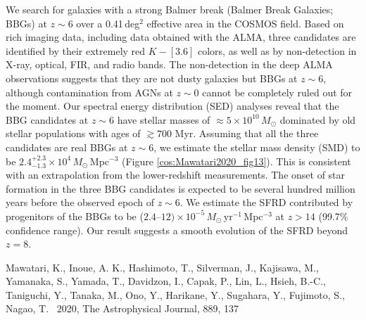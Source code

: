 We search for galaxies with a strong Balmer break (Balmer Break Galaxies; BBGs) 
at $z \sim 6$ over a 0.41\,deg$^2$ effective area in the COSMOS field. 
Based on rich imaging data, including data obtained with the ALMA, 
three candidates are identified by their extremely red $K - [3.6]$ colors, 
as well as by non-detection in X-ray, optical, 
FIR, 
and radio bands. 
The non-detection in the deep ALMA observations suggests that 
they are not dusty galaxies but BBGs at $z \sim 6$, 
although contamination from 
AGNs 
at $z \sim 0$ cannot be completely ruled out for the moment.
Our spectral energy distribution (SED) analyses reveal that 
the BBG candidates at $z \sim 6$ have stellar masses of $\approx 5 \times 10^{10}\,M_{\odot}$ 
dominated by old stellar populations with ages of $\gtrsim 700$ Myr. 
Assuming that all the three candidates are real BBGs at $z \sim 6$, 
we estimate the stellar mass density (SMD) to be $2.4^{+2.3}_{-1.3} \times 10^{4}\,M_{\odot}$\,Mpc$^{-3}$ 
(Figure \ref{cos:Mawatari2020_fig13}). 
This is consistent with an extrapolation from the lower-redshift measurements. 
The onset of star formation in the three BBG candidates is expected to be several hundred million years 
before the observed epoch of $z \sim 6$. 
We estimate the 
SFRD 
contributed by progenitors of the BBGs 
to be ($2.4$--$12) \times 10^{-5}\,M_{\odot}$\,yr$^{-1}\,$Mpc$^{-3}$ at $z > 14$ (99.7\% confidence range). 
Our result suggests a smooth evolution of the SFRD beyond $z = 8$. 


\begin{thebibliography}{9}
Mawatari, K., Inoue, A. K., Hashimoto, T., Silverman, J., Kajisawa, M., Yamanaka, S., Yamada, T., Davidzon, I., Capak, P., Lin, L., Hsieh, B.-C., Taniguchi, Y., Tanaka, M., Ono, Y., Harikane, Y., Sugahara, Y., Fujimoto, S., Nagao, T. 
\ 2020, 
The Astrophysical Journal, 889, 137 
\end{thebibliography}



